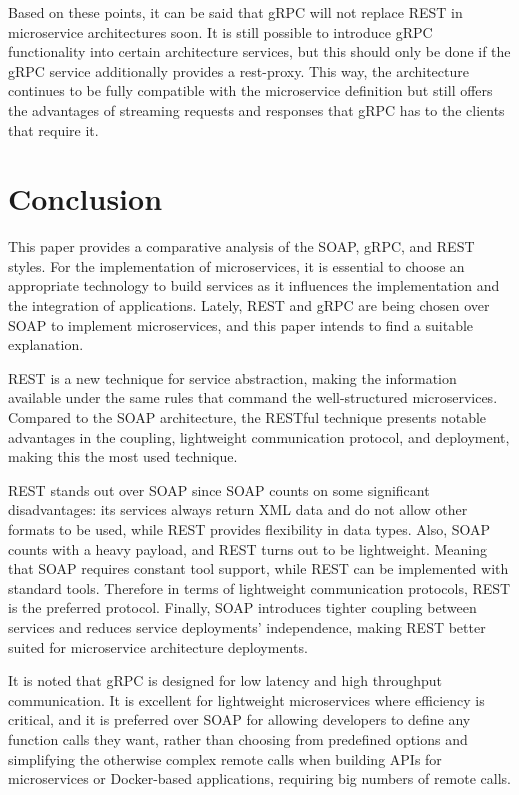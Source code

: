 \documentclass[conference]{IEEEtran}
\begin{document}
Based on these points, it can be said that gRPC will not replace REST in microservice architectures soon. It is still possible to introduce gRPC functionality into certain architecture services, but this should only be done if the gRPC service additionally provides a rest-proxy. This way, the architecture continues to be fully compatible with the microservice definition but still offers the advantages of streaming requests and responses that gRPC has to the clients that require it.

\section{Conclusion}

This paper provides a comparative analysis of the SOAP, gRPC, and REST styles. For the implementation of microservices, it is essential to choose an appropriate technology to build services as it influences the implementation and the integration of applications. Lately, REST and gRPC are being chosen over SOAP to implement microservices, and this paper intends to find a suitable explanation. 

REST is a new technique for service abstraction, making the information available under the same rules that command the well-structured microservices. Compared to the SOAP architecture, the RESTful technique presents notable advantages in the coupling, lightweight communication protocol, and deployment, making this the most used technique. 

REST stands out over SOAP since SOAP counts on some significant disadvantages: its services always return XML data and do not allow other formats to be used, while REST provides flexibility in data types. Also, SOAP counts with a heavy payload, and REST turns out to be lightweight. Meaning that SOAP requires constant tool support, while REST can be implemented with standard tools. Therefore in terms of lightweight communication protocols, REST is the preferred protocol. Finally, SOAP introduces tighter coupling between services and reduces service deployments' independence, making REST better suited for microservice architecture deployments.

It is noted that gRPC is designed for low latency and high throughput communication. It is excellent for lightweight microservices where efficiency is critical, and it is preferred over SOAP for allowing developers to define any function calls they want, rather than choosing from predefined options and simplifying the otherwise complex remote calls when building APIs for microservices or Docker-based applications, requiring big numbers of remote calls.
\end{document}

